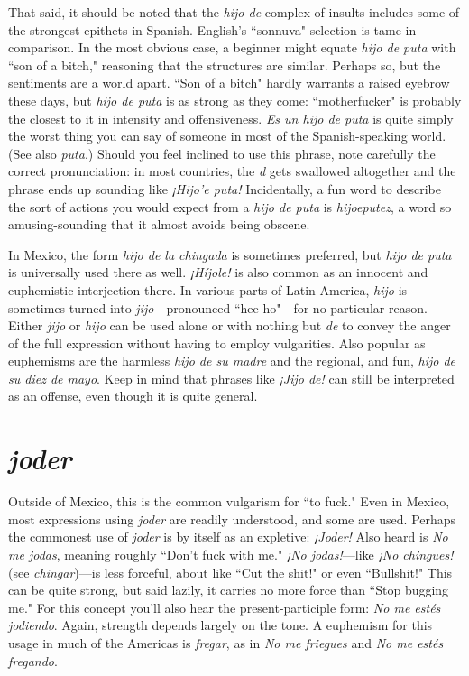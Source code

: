 That said, it should be noted that the \emph{hijo de} complex of insults includes some of the strongest epithets in Spanish. English's
``sonnuva" selection is tame in comparison. In the most obvious case,
a beginner might equate \emph{hijo de puta} with ``son of a bitch," reasoning
that the structures are similar. Perhaps so, but the sentiments are a
world apart. ``Son of a bitch" hardly warrants a raised eyebrow these
days, but \emph{hijo de puta} is as strong as they come: ``motherfucker" is
probably the closest to it in intensity and offensiveness. \emph{Es un hijo de
	puta} is quite simply the worst thing you can say of someone in most of
the Spanish-speaking world. (See also \emph{puta}.) Should you feel inclined
to use this phrase, note carefully the correct pronunciation: in most
countries, the \emph{d} gets swallowed altogether and the phrase ends up sounding like \emph{¡Hijo'e puta!} Incidentally, a fun word to describe the sort of
actions you would expect from a \emph{hijo de puta} is \emph{hijoeputez}, a word so
amusing-sounding that it almost avoids being obscene.

In Mexico, the form \emph{hijo de la chingada} is sometimes preferred, but \emph{hijo de puta} is universally used there as well. \emph{¡Híjole!} is
also common as an innocent and euphemistic interjection there. In
various parts of Latin America, \emph{hijo} is sometimes turned into \emph{jijo}---pronounced ``hee-ho"---for no particular reason. Either \emph{jijo} or \emph{hijo} can
be used alone or with nothing but \emph{de} to convey the anger of the full
expression without having to employ vulgarities. Also popular as euphemisms are the harmless \emph{hijo de su madre} and the regional, and fun,
\emph{hijo de su diez de mayo}. Keep in mind that phrases like \emph{¡Jijo de!} can
still be interpreted as an offense, even though it is quite general.

\section{\emph{joder}}

Outside of Mexico, this is the common vulgarism for ``to
fuck." Even in Mexico, most expressions using \emph{joder} are readily understood, and some are used. Perhaps the commonest use of \emph{joder} is by
itself as an expletive: \emph{¡Joder!} Also heard is \emph{No me jodas}, meaning
roughly ``Don't fuck with me." \emph{¡No jodas!}---like \emph{¡No chingues!} (see
\emph{chingar})---is less forceful, about like ``Cut the shit!" or even ``Bullshit!" This can be quite strong, but said lazily, it carries no more force
than ``Stop bugging me." For this concept you'll also hear the present-participle form: \emph{No me estés jodiendo}. Again, strength depends largely
on the tone. A euphemism for this usage in much of the Americas is
\emph{fregar}, as in \emph{No me friegues} and \emph{No me estés fregando}.

